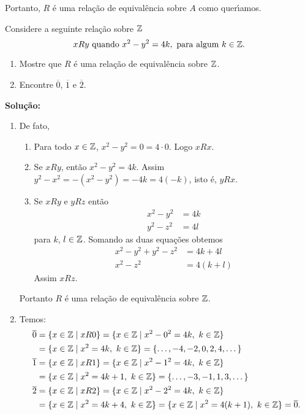 \documentclass[12pt]{exam}
\begin{document}
Portanto, $R$ \'e uma rela\c{c}\~ao de equival\^encia sobre $A$ como quer{\'\i}amos.

\vspace{.5cm}

\questao Considere a seguinte rela\c{c}\~ao sobre $\mathbb{Z}$
\[
	xRy \mbox{ quando } x^2 - y^2 = 4k, \mbox{ para algum } k \in \mathbb{Z}.
\]

\begin{enumerate}[label={\alph*})]
	\item Mostre que $R$ \'e uma rela{\c c}{\~a}o de equival{\^e}ncia sobre $\mathbb{Z}$.
	\item Encontre $\overline{0}$, $\overline{1}$ e $\overline{2}$.
\end{enumerate}

\noindent\textbf{Solu\c{c}\~ao:}
	\begin{enumerate}[label={\alph*})]
		\item De fato,
		\begin{enumerate}[label={\roman*})]
			\item Para todo $x \in \mathbb{Z}$, $x^2 - y^2 = 0 = 4\cdot 0$. Logo $xRx$.
			\item Se $xRy$, ent\~ao $x^2 - y^2 = 4k$. Assim $y^2 - x^2 = -(x^2 - y^2) = -4k = 4(-k)$, isto \'e, $yRx$.
			\item Se $xRy$ e $yRz$ ent\~ao
			\begin{align*}
				x^2 - y^2 &= 4k\\
				y^2 - z^2 &= 4l
			\end{align*}
			para $k$, $l \in \mathbb{Z}$.
			Somando as duas equa\c{c}\~oes obtemos
			\begin{align*}\label{terceira_equacao}
				x^2 - y^2 + y^2 - z^2 &= 4k + 4l\\
				x^2 - z^2 &= 4(k + l)
			\end{align*}
			Assim $xRz$.
		\end{enumerate}

		Portanto $R$ \'e uma rela\c{c}\~ao de equival\^encia sobre $\mathbb{Z}$.

		\item Temos:
		\begin{align*}
			\overline{0} &= \{x \in \mathbb{Z} \mid xR0\} = \{x \in \mathbb{Z} \mid x^2 - 0^2 = 4k,\ k \in \mathbb{Z}\} \\
			&= \{x \in \mathbb{Z} \mid x^2 = 4k, \ k \in \mathbb{Z}\} = \{\dots, -4,-2,0,2,4, \dots\}\\
			\overline{1} &= \{x \in \mathbb{Z} \mid xR1\} = \{x \in \mathbb{Z} \mid x^2 - 1^2 = 4k,\ k \in \mathbb{Z}\} \\
			&= \{x \in \mathbb{Z} \mid x^2 = 4k + 1, \ k \in \mathbb{Z}\} = \{\dots, -3,-1,1,3, \dots\}\\
			\overline{2} &= \{x \in \mathbb{Z} \mid xR2\} = \{x \in \mathbb{Z} \mid x^2 - 2^2 = 4k,\ k \in \mathbb{Z}\} \\
			&= \{x \in \mathbb{Z} \mid x^2 = 4k + 4, \ k \in \mathbb{Z}\} = \{x \in \mathbb{Z} \mid x^2 = 4(k + 1), \ k \in \mathbb{Z}\} = \overline{0}.
		\end{align*}
	\end{enumerate}
\end{document}
